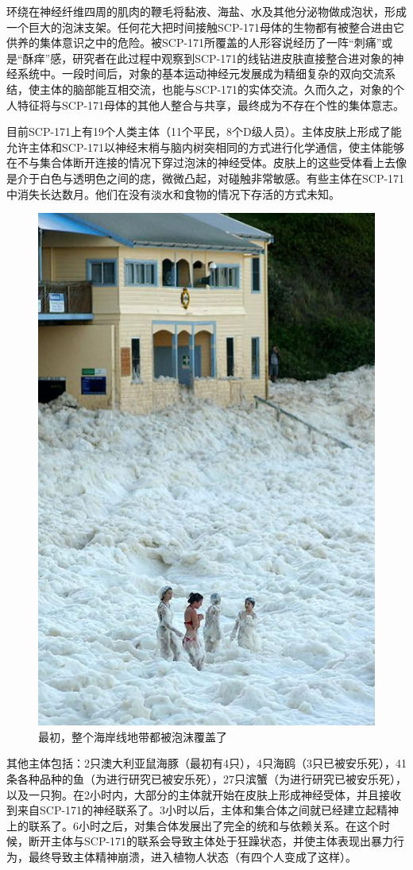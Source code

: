 环绕在神经纤维四周的肌肉的鞭毛将黏液、海盐、水及其他分泌物做成泡状，形成一个巨大的泡沫支架。任何花大把时间接触SCP-171母体的生物都有被整合进由它供养的集体意识之中的危险。被SCP-171所覆盖的人形容说经历了一阵“刺痛”或是“酥痒”感，研究者在此过程中观察到SCP-171的线钻进皮肤直接整合进对象的神经系统中。一段时间后，对象的基本运动神经元发展成为精细复杂的双向交流系结，使主体的脑部能互相交流，也能与SCP-171的实体交流。久而久之，对象的个人特征将与SCP-171母体的其他人整合与共享，最终成为不存在个性的集体意志。

目前SCP-171上有19个人类主体（11个平民，8个D级人员）。主体皮肤上形成了能允许主体和SCP-171以神经末梢与脑内树突相同的方式进行化学通信，使主体能够在不与集合体断开连接的情况下穿过泡沫的神经受体。皮肤上的这些受体看上去像是介于白色与透明色之间的痣，微微凸起，对碰触非常敏感。有些主体在SCP-171中消失长达数月。他们在没有淡水和食物的情况下存活的方式未知。

\begin{figure}[H]
    \centering
    \includegraphics[width=0.5\linewidth]{images/SCP-171-3.jpg}
    \caption*{最初，整个海岸线地带都被泡沫覆盖了}
\end{figure}

其他主体包括：2只澳大利亚鼠海豚（最初有4只），4只海鸥（3只已被安乐死），41条各种品种的鱼（为进行研究已被安乐死），27只滨蟹（为进行研究已被安乐死），以及一只狗。在2小时内，大部分的主体就开始在皮肤上形成神经受体，并且接收到来自SCP-171的神经联系了。3小时以后，主体和集合体之间就已经建立起精神上的联系了。6小时之后，对集合体发展出了完全的统和与依赖关系。在这个时候，断开主体与SCP-171的联系会导致主体处于狂躁状态，并使主体表现出暴力行为，最终导致主体精神崩溃，进入植物人状态（有四个人变成了这样）。

